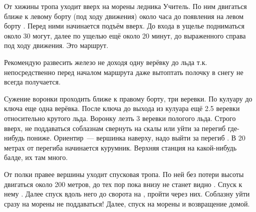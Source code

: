 От хижины \geoLighthouse{} тропа уходит вверх на морены ледника Учитель.
По ним двигаться ближе к левому борту (под ходу движения) около часа
до появления на левом борту . Перед ними начинается подъём вверх. До входа в ущелье
подниматься около 30 могут, далее по ущелью ещё около 20 минут, до
выраженного  справа под ходу движения. Это маршрут.

Рекомендую развесить железо не доходя одну верёвку до льда т.к.
непосредственно перед началом маршрута даже вытоптать полочку в снегу
не всегда получается.

Сужение воронки проходить ближе к правому борту, три веревки. По
кулуару до ключа еще одна верёвка.  После ключа до выхода из кулуара ещё
2.5 веревки относительно крутого льда. Воронку лезть 3 веревки
пологого льда. Строго вверх, не поддаваться соблазнам свернуть на
скалы или уйти за перегиб где-нибудь пониже. Ориентир~--- вершинка
наверху, надо выйти за перегиб
. В 20
метрах от перегиба начинается курумник. Верхняя станция на
какой-нибудь балде, их там много.

От полки правее вершины уходит спусковая тропа. По ней без потери
высоты двигаться около 200 метров, до тех пор пока внизу не станет
видно . Спуск к
нему . Далее спуск вдоль
него до сворота на \geoCampTomsk{}, пройти через них. Соблазну уйти
сразу на морены не поддаваться! Далее, спуск на морены и возвращение
домой.
